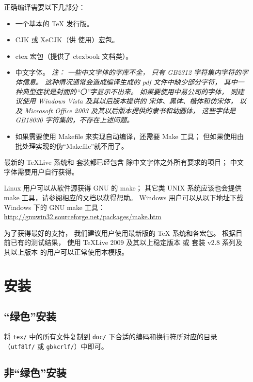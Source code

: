 	正确编译需要以下几部分：
	\begin{itemize}
		\item 一个基本的 \TeX{} 发行版。
		\item CJK 或 XeCJK（供  使用）宏包。
		\item ctex 宏包\cite{ctex,ctex-faq}（提供了 ctexbook 文档类）。
		\item 中文字体。\emph{%
			注：
			一些中文字体的字库不全，
			只有 GB2312 字符集内字符的字体信息。
			这种情况通常会造成编译生成的 pdf 文件中缺少部分字符，
			其中一种典型症状是封面的“〇”字显示不出来。
			如果要使用中易公司的字体，
			则建议使用 Windows Vista 及其以后版本提供的%
			宋体、黑体、楷体和仿宋体，
			以及 Microsoft Office 2003 及其以后版本提供的隶书和幼圆体，
			这些字体是 GB18030 字符集的，不存在上述问题。%
		}
		\item 如果需要使用 Makefile 来实现自动编译，还需要 Make 工具；
			但如果使用由批处理实现的伪“Makefile”就不用了。
	\end{itemize}

	最新的 \TeX{}Live 系统和 \CTeX{} 套装都已经包含%
	除中文字体之外所有要求的项目；
	中文字体需要用户自行获得。

	Linux 用户可以从软件源获得 GNU 的 make；
	其它类 UNIX 系统应该也会提供 make 工具，请参阅相应的文档以获得帮助。%
	Windows 用户可以从以下地址下载 Windows 下的 GNU make 工具：\\
	\hspace*{\parindent}%
	\url{http://gnuwin32.sourceforge.net/packages/make.htm}

	为了获得最好的支持，
	我们建议用户使用最新版的 \TeX{} 系统和各宏包。
	根据目前已有的测试结果，
	使用 \TeX{}Live 2009 及其以上稳定版本%
	或 \CTeX{} 套装 v2.8 系列及其以上版本
	的用户可以正常使用本模版。
	
	\section{安装}\label{sec:inst}
	\subsection{“绿色”安装}

	将 \verb|tex/| 中的所有文件复制到 %
	\verb|doc/| 下合适的编码和换行符所对应的目录%
	（\verb|utf8lf/| 或 \verb|gbkcrlf/|）中即可。

	\subsection{非“绿色”安装}

